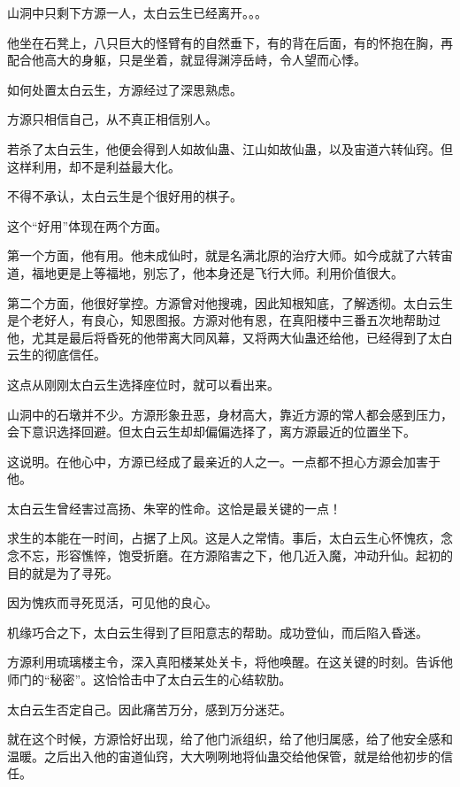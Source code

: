 
\begin{this_body}

山洞中只剩下方源一人，太白云生已经离开。。。

他坐在石凳上，八只巨大的怪臂有的自然垂下，有的背在后面，有的怀抱在胸，再配合他高大的身躯，只是坐着，就显得渊渟岳峙，令人望而心悸。

如何处置太白云生，方源经过了深思熟虑。

方源只相信自己，从不真正相信别人。

若杀了太白云生，他便会得到人如故仙蛊、江山如故仙蛊，以及宙道六转仙窍。但这样利用，却不是利益最大化。

不得不承认，太白云生是个很好用的棋子。

这个“好用”体现在两个方面。

第一个方面，他有用。他未成仙时，就是名满北原的治疗大师。如今成就了六转宙道，福地更是上等福地，别忘了，他本身还是飞行大师。利用价值很大。

第二个方面，他很好掌控。方源曾对他搜魂，因此知根知底，了解透彻。太白云生是个老好人，有良心，知恩图报。方源对他有恩，在真阳楼中三番五次地帮助过他，尤其是最后将昏死的他带离大同风幕，又将两大仙蛊还给他，已经得到了太白云生的彻底信任。

这点从刚刚太白云生选择座位时，就可以看出来。

山洞中的石墩并不少。方源形象丑恶，身材高大，靠近方源的常人都会感到压力，会下意识选择回避。但太白云生却却偏偏选择了，离方源最近的位置坐下。

这说明。在他心中，方源已经成了最亲近的人之一。一点都不担心方源会加害于他。

太白云生曾经害过高扬、朱宰的性命。这恰是最关键的一点！

求生的本能在一时间，占据了上风。这是人之常情。事后，太白云生心怀愧疚，念念不忘，形容憔悴，饱受折磨。在方源陷害之下，他几近入魔，冲动升仙。起初的目的就是为了寻死。

因为愧疚而寻死觅活，可见他的良心。

机缘巧合之下，太白云生得到了巨阳意志的帮助。成功登仙，而后陷入昏迷。

方源利用琉璃楼主令，深入真阳楼某处关卡，将他唤醒。在这关键的时刻。告诉他师门的“秘密”。这恰恰击中了太白云生的心结软肋。

太白云生否定自己。因此痛苦万分，感到万分迷茫。

就在这个时候，方源恰好出现，给了他门派组织，给了他归属感，给了他安全感和温暖。之后出入他的宙道仙窍，大大咧咧地将仙蛊交给他保管，就是给他初步的信任。


\end{this_body}
